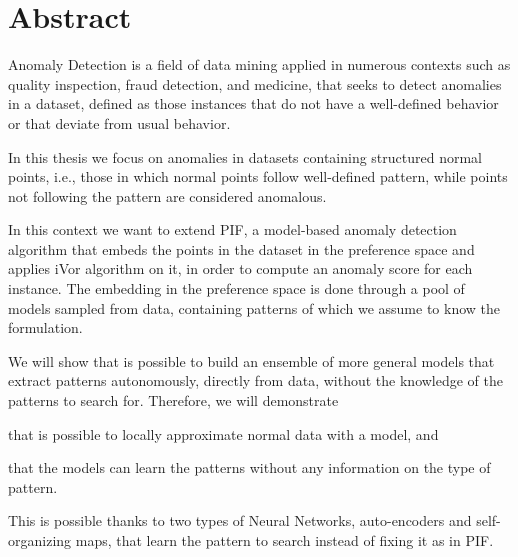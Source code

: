 \chapter*{Abstract} 
\label{ch:abstract_en}

\hspace{5pt}
Anomaly Detection is a field of data mining applied in numerous contexts such as quality inspection, fraud detection, and medicine, that seeks to detect anomalies in a dataset, defined as those instances that do not have a well-defined behavior or that deviate from usual behavior.

\hspace{5pt}
In this thesis we focus on anomalies in datasets containing structured normal points, i.e., those in which normal points follow well-defined pattern, while points not following the pattern are considered anomalous. 
\begin{comment}
    \newline
    As an example, consider a dataset containing information about the position of the joints of a mechanical robot; the joints are constrained in the movements and can occupy only certain regions of the space, following predetermined patterns of movements. In this context, correct positions will follow the pattern and will be considered normal points in the space; anomalous positions, instead, indicate a wrong position of a joint not following the pattern, which could cause breakdowns. \newline
    Therefore, it is very important being able to detect this anomalies in order to mitigate the possibility of unexpected events.
\end{comment}

\hspace{5pt}
In this context we want to extend PIF, a model-based anomaly detection algorithm that embeds the points in the dataset in the preference space and applies iVor algorithm on it, in order to compute an anomaly score for each instance. The embedding in the preference space is done through a pool of models sampled from data, containing patterns of which we assume to know the formulation.

\hspace{5pt}
We will show that is possible to build an ensemble of more general models that extract patterns autonomously, directly from data, without the knowledge of the patterns to search for. Therefore, we will demonstrate 
\begin{enumerate*}[label=(\roman*)]
    \item that is possible to locally approximate normal data with a model, and
    \item that the models can learn the patterns without any information on the type of pattern.
\end{enumerate*}
This is possible thanks to two types of Neural Networks, auto-encoders and self-organizing maps, that learn the pattern to search instead of fixing it as in PIF.

